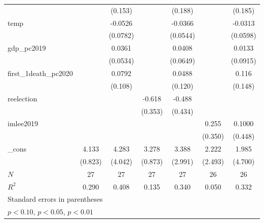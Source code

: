 {\begin{tabular}{l*{6}{c}}
            &                     &     (0.153)         &                     &     (0.188)         &                     &     (0.185)         \\
[1em]
temp        &                     &     -0.0526         &                     &     -0.0366         &                     &     -0.0313         \\
            &                     &    (0.0782)         &                     &    (0.0544)         &                     &    (0.0598)         \\
[1em]
gdp\_pc2019  &                     &      0.0361         &                     &      0.0408         &                     &      0.0133         \\
            &                     &    (0.0534)         &                     &    (0.0649)         &                     &    (0.0915)         \\
[1em]
first\_1death\_pc2020&                     &      0.0792         &                     &      0.0488         &                     &       0.116         \\
            &                     &     (0.108)         &                     &     (0.120)         &                     &     (0.148)         \\
[1em]
reelection  &                     &                     &      -0.618\sym{*}  &      -0.488         &                     &                     \\
            &                     &                     &     (0.353)         &     (0.434)         &                     &                     \\
[1em]
imlee2019   &                     &                     &                     &                     &       0.255         &      0.1000         \\
            &                     &                     &                     &                     &     (0.350)         &     (0.448)         \\
[1em]
\_cons      &       4.133\sym{***}&       4.283         &       3.278\sym{***}&       3.388         &       2.222         &       1.985         \\
            &     (0.823)         &     (4.042)         &     (0.873)         &     (2.991)         &     (2.493)         &     (4.700)         \\
\hline
\(N\)       &          27         &          27         &          27         &          27         &          26         &          26         \\
\(R^{2}\)   &       0.290         &       0.408         &       0.135         &       0.340         &       0.050         &       0.332         \\
\hline\hline
\multicolumn{7}{l}{\footnotesize Standard errors in parentheses}\\
\multicolumn{7}{l}{\footnotesize \sym{*} \(p<0.10\), \sym{**} \(p<0.05\), \sym{***} \(p<0.01\)}\\
\end{tabular}
}
